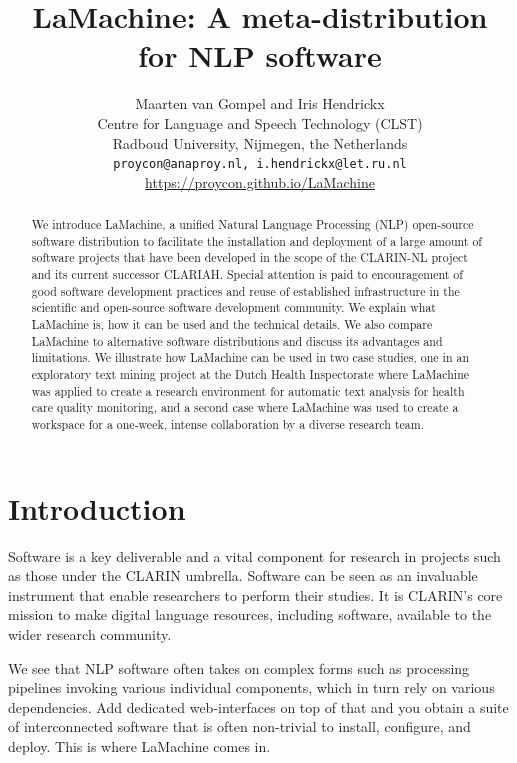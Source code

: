 \documentclass[a4paper,11pt]{article}
\title{LaMachine: A meta-distribution for NLP software}
\author{Maarten van Gompel  and Iris Hendrickx\\
  Centre for Language and Speech Technology (CLST) \\
  Radboud University, Nijmegen, the Netherlands \\
  {\tt proycon@anaproy.nl, i.hendrickx@let.ru.nl} \\ %
  \url{https://proycon.github.io/LaMachine}
}
\date{}
\begin{document}
\maketitle

\begin{abstract}
We introduce LaMachine, a unified Natural Language Processing (NLP) open-source software distribution to facilitate the
installation and deployment of a large amount of software projects that have been developed in the scope of the
CLARIN-NL project and its current successor CLARIAH. Special attention is paid to encouragement of good software
development practices and reuse of established infrastructure in the scientific and open-source software development
community. We explain what LaMachine is, how it can be used and the technical details. We also compare LaMachine to alternative software distributions and discuss its advantages and limitations. We illustrate how LaMachine can be used in two case studies, one in an exploratory text mining project at the Dutch Health Inspectorate where LaMachine was applied to create a research environment for automatic text analysis for health care quality monitoring, and a second case where LaMachine was used to create a workspace for a one-week, intense collaboration by a diverse research team.
\end{abstract}

\section{Introduction}
\label{sec:intro}

Software is a key deliverable and a vital component for research in projects such as those under the CLARIN umbrella.
Software can be seen as an invaluable instrument that enable researchers to perform their studies. It is CLARIN's core mission to make
digital language resources, including software, available to the wider research community.

We see that NLP software often takes on complex forms such as processing pipelines invoking various individual
components, which in turn rely on various dependencies. Add dedicated web-interfaces on top of that and you obtain a
suite of interconnected software that is often non-trivial to install, configure, and deploy. This is where LaMachine
comes in.
\end{document}
